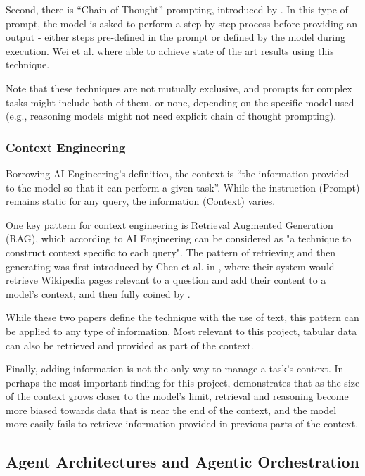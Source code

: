 \documentclass[a4paper]{report}
\begin{document}
Second, there is ``Chain-of-Thought'' prompting, introduced by \cite{wei2023chainofthoughtpromptingelicitsreasoning}. In this type of prompt, the model is asked to perform a step by step process before providing an output - either steps pre-defined in the prompt or defined by the model during execution. Wei et al. where able to achieve state of the art results using this technique.

Note that these techniques are not mutually exclusive, and prompts for complex tasks might include both of them, or none, depending on the specific model used (e.g., reasoning models might not need explicit chain of thought prompting).

\subsubsection{Context Engineering}

Borrowing AI Engineering's definition, the context is ``the information provided to the model so that it can perform a given task''. While the instruction (Prompt) remains static for any query, the information (Context) varies.

One key pattern for context engineering is Retrieval Augmented Generation (RAG), which according to AI Engineering can be considered as "a technique to construct context specific to each query". The pattern of retrieving and then generating was first introduced by Chen et al. in \cite{chen2017readingwikipediaansweropendomain}, where their system would retrieve Wikipedia pages relevant to a question and add their content to a model's context, and then fully coined by \cite{lewis2021retrievalaugmentedgeneration}.

While these two papers define the technique with the use of text, this pattern can be applied to any type of information. Most relevant to this project, tabular data can also be retrieved and provided as part of the context.

Finally, adding information is not the only way to manage a task's context. In perhaps the most important finding for this project, \cite{veseli2025positionalbiasesshiftinputs} demonstrates that as the size of the context grows closer to the model's limit, retrieval and reasoning become more biased towards data that is near the end of the context, and the model more easily fails to retrieve information provided in previous parts of the context.

\subsection{Agent Architectures and Agentic Orchestration}
\end{document}
